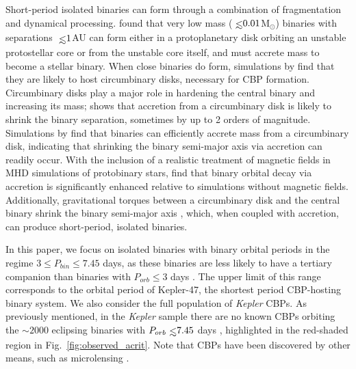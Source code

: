 Short-period isolated binaries can form through a combination of fragmentation and dynamical processing. \citet{Bonnell1994} found that very low mass ($\lsim 0.01$M$_{\odot}$) binaries with separations $\lsim 1$AU can form either in a protoplanetary disk orbiting an unstable protostellar core or from the unstable core itself, and must accrete mass to become a stellar binary.  When close binaries do form, simulations by \citet{Bate2000} find that they are likely to host circumbinary disks, necessary for CBP formation.  Circumbinary disks play a major role in hardening the central binary and increasing its mass; \citet{Bate2000} shows that accretion from a circumbinary disk is likely to shrink the binary separation, sometimes by up to 2 orders of magnitude.  Simulations by \citet{Arty1996} find that binaries can efficiently accrete mass from a circumbinary disk, indicating that shrinking the binary semi-major axis via accretion can readily occur.  With the inclusion of a realistic treatment of magnetic fields in MHD simulations of protobinary stars, \citet{Zhao2013} find that binary orbital decay via accretion is significantly enhanced relative to simulations without magnetic fields.  Additionally, gravitational torques between a circumbinary disk and the central binary shrink the binary semi-major axis \citep[e.g.][]{Arty1991,Bate2002,Armitage2005,Fleming2017}, which, when coupled with accretion, can produce short-period, isolated binaries.

In this paper, we focus on isolated binaries with binary orbital periods in the regime $3 \leq P_{bin} \leq 7.45 $ days, as these binaries are less likely to have a tertiary companion than binaries with $P_{orb} \leq 3$ days \citep{Tokovinin2006}.  The upper limit of this range corresponds to the orbital period of Kepler-47, the shortest period CBP-hosting binary system.  We also consider the full population of \textit{Kepler} CBPs.  As previously mentioned, in the {\it Kepler} sample there are no known CBPs orbiting the ${\sim 2000}$ eclipsing binaries with $P_{orb} \lsim 7.45$ days \citep{Kirk2016}, highlighted in the red-shaded region in Fig.~\ref{fig:observed_acrit}.  Note that CBPs have been discovered by other means, such as microlensing \citep[e.g.][]{Bennett2016}. 



